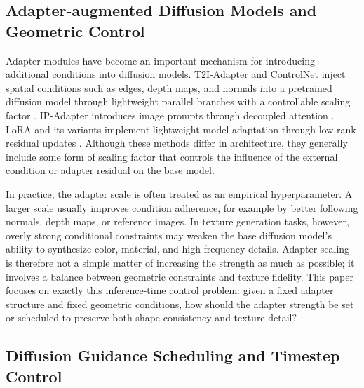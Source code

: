 \documentclass[times,twocolumn,final]{elsarticle}
\providecommand{\DIFadd}[1]{{\protect\color{blue} \sf #1}} %
\providecommand{\DIFaddbegin}{} %
\providecommand{\DIFaddend}{} %
\newcommand{\DIFaddincludegraphics}[2][]{{\color{blue}\fbox{\DIFOincludegraphics[#1]{#2}}}} %
\DeclareRobustCommand{\DIFaddbegin}{\DIFOaddbegin \let\includegraphics\DIFaddincludegraphics} %
\DeclareRobustCommand{\DIFaddend}{\DIFOaddend \let\includegraphics\DIFOincludegraphics} %
\begin{document}
\subsection{Adapter-augmented Diffusion Models and Geometric Control}
\label{subsec:adapter}

Adapter modules have become an important mechanism for introducing additional conditions into diffusion models.   \DIFaddbegin \DIFadd{T2I-Adapter and ControlNet inject }\DIFaddend spatial conditions such as edges, depth maps, and normals into a pretrained diffusion model through   \DIFaddbegin \DIFadd{lightweight parallel branches with a controllable scaling factor \cite{mou2023t2iadapter,zhang2023controlnet}}\DIFaddend . IP-Adapter introduces image prompts through decoupled attention \cite{ye2023ipadapter}. LoRA and its variants implement lightweight model adaptation through low-rank residual updates \cite{hu2022lora,liu2024dora,zhang2023adalora}. Although these methods differ in architecture, they generally include some form of scaling factor that controls the influence of the external condition or adapter residual on the base model.

In practice, the adapter scale is often treated as an empirical hyperparameter. A larger scale usually improves condition adherence, for example by better following normals, depth maps, or reference images. In texture generation tasks, however, overly strong conditional constraints may weaken the base diffusion model's ability to synthesize color, material, and high-frequency details. Adapter scaling is therefore not a simple matter of increasing the strength as much as possible; it involves a balance between geometric constraints and texture fidelity. This paper focuses on exactly this inference-time control problem: given a fixed adapter structure and fixed geometric conditions, how should the adapter strength be set or scheduled to preserve both shape consistency and texture detail?

\subsection{Diffusion Guidance Scheduling and Timestep Control}
\label{subsec:guidance}
\end{document}
